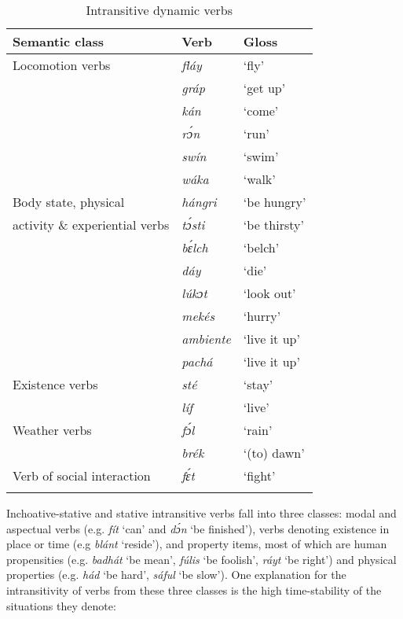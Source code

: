 \begin{table}
\caption{Intransitive dynamic verbs}
\label{tab:key:9.3}

\begin{tabularx}{\textwidth}{lXX}
\lsptoprule
Semantic class & Verb & Gloss\\
\midrule 
Locomotion verbs & \itshape fláy & ‘fly’\\
& \itshape gráp & ‘get up’\\
& \itshape kán & ‘come’\\
& \itshape rɔ́n & ‘run’\\
& \itshape swín & ‘swim’\\
& \itshape wáka & ‘walk’\\

\tablevspace
Body state, physical & \itshape hángri & ‘be hungry’\\
activity \& experiential verbs & \itshape tɔ́sti & ‘be thirsty’\\
& \itshape bɛ́lch & ‘belch’\\
& \itshape dáy & ‘die’\\
& \itshape lúkɔt & ‘look out’\\
& \itshape mekés & ‘hurry’\\
& \itshape ambiente & ‘live it up’\\
& \itshape pachá & ‘live it up’\\

\tablevspace
Existence verbs & \itshape sté & ‘stay’\\
& \itshape líf & ‘live’\\

\tablevspace
Weather verbs & \itshape fɔ́l & ‘rain’\\
& \itshape brék & ‘(to) dawn’\\

\tablevspace
Verb of social interaction & \itshape fɛ́t & ‘fight’\\
\lspbottomrule
\end{tabularx}
\end{table}
Inchoative-stative and stative intransitive verbs fall into three classes: modal and aspectual verbs (e.g. \textit{fít} ‘can’ and \textit{dɔ́n} ‘be finished’), verbs denoting existence in place or time (e.g \textit{blánt} ‘reside’), and property items, most of which are human propensities (e.g. \textit{badhát} ‘be mean’, \textit{fúlis} ‘be foolish’, \textit{ráyt} ‘be right’) and physical properties (e.g. \textit{hád} ‘be hard’, \textit{sáful} ‘be slow’). One explanation for the intransitivity of verbs from these three classes is the high time-stability of the situations they denote:

